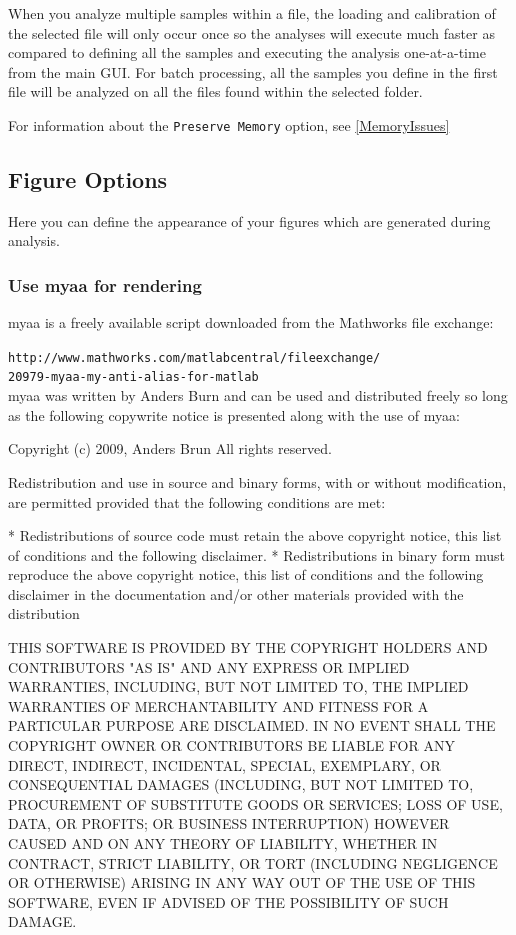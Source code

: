 \documentclass[11pt]{report}
\begin{document}
When you analyze multiple samples within a file, the loading and calibration of the selected file will only occur once so the analyses will execute much faster as compared to defining all the samples and executing the analysis one-at-a-time from the main GUI.  For batch processing, all the samples you define in the first file will be analyzed on all the files found within the selected folder.

For information about the \texttt{Preserve Memory} option, see \ref{MemoryIssues}

\subsection{Figure Options}
Here you can define the appearance of your figures which are generated during analysis.

\subsubsection{Use myaa for rendering}
myaa is a freely available script downloaded from the Mathworks file exchange:

 \texttt{http://www.mathworks.com/matlabcentral/fileexchange/\\20979-myaa-my-anti-alias-for-matlab}\\

myaa was written by Anders Burn and can be used and distributed freely so long as the following copywrite notice is presented along with the use of myaa:

\begin{mdframed}[backgroundcolor = black!10]

Copyright (c) 2009, Anders Brun
All rights reserved.

Redistribution and use in source and binary forms, with or without
modification, are permitted provided that the following conditions are
met:

    * Redistributions of source code must retain the above copyright
      notice, this list of conditions and the following disclaimer.
    * Redistributions in binary form must reproduce the above copyright
      notice, this list of conditions and the following disclaimer in
      the documentation and/or other materials provided with the distribution

THIS SOFTWARE IS PROVIDED BY THE COPYRIGHT HOLDERS AND CONTRIBUTORS "AS IS"
AND ANY EXPRESS OR IMPLIED WARRANTIES, INCLUDING, BUT NOT LIMITED TO, THE
IMPLIED WARRANTIES OF MERCHANTABILITY AND FITNESS FOR A PARTICULAR PURPOSE
ARE DISCLAIMED. IN NO EVENT SHALL THE COPYRIGHT OWNER OR CONTRIBUTORS BE
LIABLE FOR ANY DIRECT, INDIRECT, INCIDENTAL, SPECIAL, EXEMPLARY, OR
CONSEQUENTIAL DAMAGES (INCLUDING, BUT NOT LIMITED TO, PROCUREMENT OF
SUBSTITUTE GOODS OR SERVICES; LOSS OF USE, DATA, OR PROFITS; OR BUSINESS
INTERRUPTION) HOWEVER CAUSED AND ON ANY THEORY OF LIABILITY, WHETHER IN
CONTRACT, STRICT LIABILITY, OR TORT (INCLUDING NEGLIGENCE OR OTHERWISE)
ARISING IN ANY WAY OUT OF THE USE OF THIS SOFTWARE, EVEN IF ADVISED OF THE
POSSIBILITY OF SUCH DAMAGE.

\end{mdframed}
\end{document}
